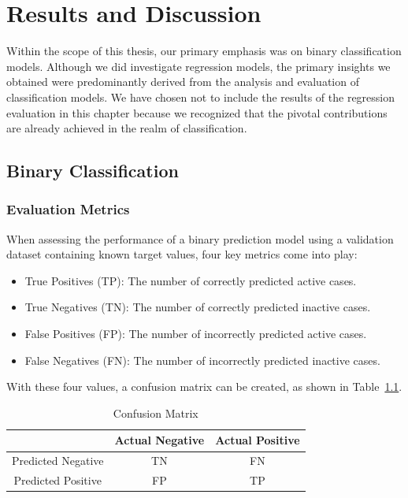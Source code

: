 \chapter{Results and Discussion}\label{chap:results_discussion}

Within the scope of this thesis, our primary emphasis was on binary classification models. Although we did investigate regression models, the primary insights we obtained were predominantly derived from the analysis and evaluation of classification models. We have chosen not to include the results of the regression evaluation in this chapter because we recognized that the pivotal contributions are already achieved in the realm of classification.

\section{Binary Classification}
\subsection{Evaluation Metrics}
When assessing the performance of a binary prediction model using a validation dataset containing known target values, four key metrics come into play:

\begin{itemize}
  \item True Positives (TP): The number of correctly predicted active cases.
  \item True Negatives (TN): The number of correctly predicted inactive cases.
  \item False Positives (FP): The number of incorrectly predicted active cases.
  \item False Negatives (FN): The number of incorrectly predicted inactive cases.
\end{itemize}

With these four values, a confusion matrix can be created, as shown in Table~\ref{tab:confusion_matrix}.

\begin{table}[h]
  \centering
  \caption{Confusion Matrix}
  \label{tab:confusion_matrix}
  \setlength{\tabcolsep}{10pt} %
  \renewcommand{\arraystretch}{1.5} %
  \begin{tabular}{|c|c|c|}
  \cline{2-3}
  \multicolumn{1}{c|}{} & Actual Negative & Actual Positive \\
  \hline
  Predicted Negative & TN & FN \\
  \hline
  Predicted Positive & FP & TP \\
  \hline
  \end{tabular}
\end{table}

